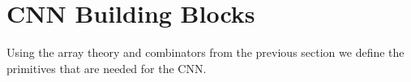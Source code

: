 % 


%   
%   


\section{CNN Building Blocks\label{sec:cnn}}

Using the array theory and combinators from the previous section we
define the primitives that are needed for the CNN.

